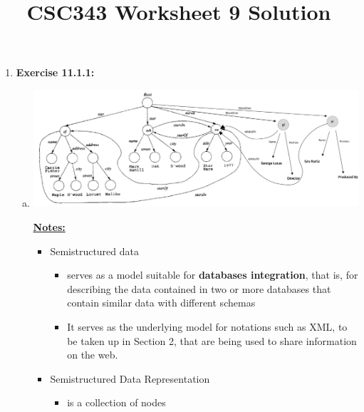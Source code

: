\documentclass[12pt]{article}
\begin{document}
\title{CSC343 Worksheet 9 Solution}
\maketitle

\bigskip

\begin{enumerate}[1.]
    \item \textbf{Exercise 11.1.1:}

    \bigskip

    \begin{enumerate}[a)]
        \item

    \begin{center}
    \includegraphics[width=\linewidth]{images/worksheet_9_solution_4.png}
    \end{center}

        \bigskip

        \underline{\textbf{Notes:}}

        \begin{itemize}
            \item Semistructured data
            \begin{itemize}
                \item serves as a model suitable for \textbf{databases integration}, that is,
                for describing the data contained in two or more databases that contain similar data with
                different schemas

                \item It serves as the underlying model for notations such as XML, to be taken
                up in Section 2, that are being used to share information on the web.
            \end{itemize}

            \item Semistructured Data Representation
            \begin{itemize}
                \item is a collection of nodes


\end{itemize}
\end{itemize}
\end{enumerate}
\end{enumerate}
\end{document}

